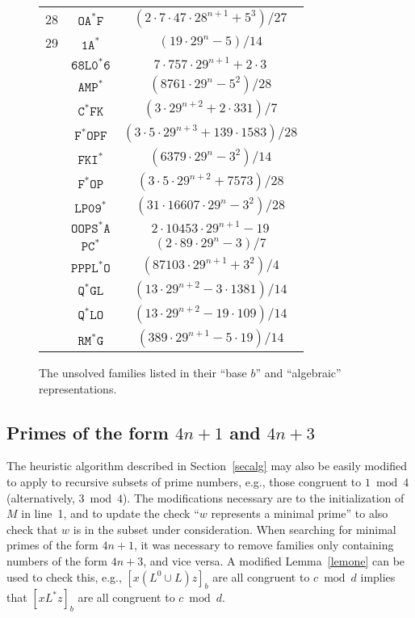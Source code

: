 \documentclass[12pt]{article}
\theoremstyle{plain}
\theoremstyle{definition}
\newcommand{\0}{\mathtt{0}}
\newcommand{\1}{\mathtt{1}}
\newcommand{\2}{\mathtt{2}}
\newcommand{\3}{\mathtt{3}}
\newcommand{\4}{\mathtt{4}}
\newcommand{\5}{\mathtt{5}}
\newcommand{\6}{\mathtt{6}}
\newcommand{\7}{\mathtt{7}}
\newcommand{\8}{\mathtt{8}}
\newcommand{\9}{\mathtt{9}}
\newcommand{\updated}[1]{{\color{red}#1}}
\renewcommand{\updated}[1]{#1}
\begin{document}
\begin{figure}
{\begin{center}
\begin{tabular}{ccc}
28 & $\mathtt{OA^*F}$ & $(2\cdot7\cdot47\cdot28^{n+1}+5^3)/27$ \\
29 & $\mathtt{1A^*}$ & $(19\cdot29^n-5)/14$ \\
& $\mathtt{68L0^*6}$ & $7\cdot757\cdot29^{n+1}+2\cdot3$ \\
& $\mathtt{AMP^*}$ & $(8761\cdot29^n-5^2)/28$ \\
& $\mathtt{C^*FK}$ & $(3\cdot29^{n+2}+2\cdot331)/7$ \\
& $\mathtt{F^*OPF}$ & $(3\cdot5\cdot29^{n+3}+139\cdot1583)/28$ \\
& $\mathtt{FKI^*}$ & $(6379\cdot29^n-3^2)/14$ \\
& $\mathtt{F^*OP}$ & $(3\cdot5\cdot29^{n+2}+7573)/28$ \\
& $\mathtt{LP09^*}$ & $(31\cdot16607\cdot29^n-3^2)/28$ \\
& $\mathtt{OOPS^*A}$ & $2\cdot10453\cdot29^{n+1}-19$ \\
& $\mathtt{PC^*}$ & $(2\cdot89\cdot29^n-3)/7$ \\
& $\mathtt{PPPL^*O}$ & $(87103\cdot29^{n+1}+3^2)/4$ \\
& $\mathtt{Q^*GL}$ & $(13\cdot29^{n+2}-3\cdot1381)/14$ \\
& $\mathtt{Q^*LO}$ & $(13\cdot29^{n+2}-19\cdot109)/14$ \\
& $\mathtt{RM^*G}$ & $(389\cdot29^{n+1}-5\cdot19)/14$
\end{tabular}\end{center}
\caption{The unsolved families listed in their ``base $b$'' and ``algebraic'' representations.}}
\label{unsolved}
\end{figure}

\subsection{\boldmath Primes of the form $4n+1$ and $4n+3$}
The heuristic algorithm described in Section~\ref{secalg} may also be easily modified to apply to recursive subsets of prime numbers,
e.g., those congruent to $1\bmod4$ (alternatively, $3\bmod4$).  The modifications necessary are to the initialization
of $M$ in line~1, and to update the check ``$w$ represents a minimal prime'' to also check that $w$ is in the subset
under consideration.  \updated{When searching for minimal primes of the form $4n+1$, it was necessary to remove families only containing
numbers of the form $4n+3$, and vice versa.  A modified Lemma~\ref{lemone} can be used to check this, e.g.,
$[x(L^0\cup L)z]_b$ are all congruent to $c\bmod d$ implies that $[xL^*z]_b$ are all congruent to $c\bmod d$.}
\end{document}
